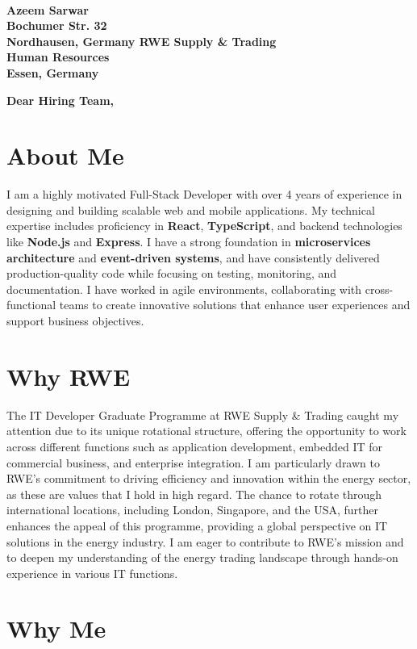 \documentclass[a4paper,12pt]{article}
\begin{document}
\textbf{ \\ Azeem Sarwar \\ Bochumer Str. 32 \\ Nordhausen, Germany RWE Supply \& Trading \\ Human Resources \\ Essen, Germany}
\date{\today}

\textbf{Dear Hiring Team,}

\section{About Me}

I am a highly motivated Full-Stack Developer with over 4 years of experience in designing and building scalable web and mobile applications. My technical expertise includes proficiency in \textbf{React}, \textbf{TypeScript}, and backend technologies like \textbf{Node.js} and \textbf{Express}. I have a strong foundation in \textbf{microservices architecture} and \textbf{event-driven systems}, and have consistently delivered production-quality code while focusing on testing, monitoring, and documentation. I have worked in agile environments, collaborating with cross-functional teams to create innovative solutions that enhance user experiences and support business objectives.

\section{Why RWE}

The IT Developer Graduate Programme at RWE Supply \& Trading caught my attention due to its unique rotational structure, offering the opportunity to work across different functions such as application development, embedded IT for commercial business, and enterprise integration. I am particularly drawn to RWE’s commitment to driving efficiency and innovation within the energy sector, as these are values that I hold in high regard. The chance to rotate through international locations, including London, Singapore, and the USA, further enhances the appeal of this programme, providing a global perspective on IT solutions in the energy industry. I am eager to contribute to RWE's mission and to deepen my understanding of the energy trading landscape through hands-on experience in various IT functions.

\section{Why Me}
\end{document}
